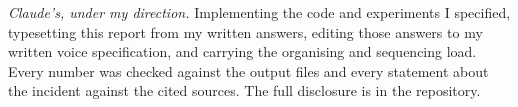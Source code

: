 \documentclass[11pt,letterpaper]{article}
\begin{document}
\noindent\textit{Claude's, under my direction.} Implementing the code and experiments I specified, typesetting this report from my written answers, editing those answers to my written voice specification, and carrying the organising and sequencing load. Every number was checked against the output files and every statement about the incident against the cited sources. The full disclosure is in the repository.
\end{document}
